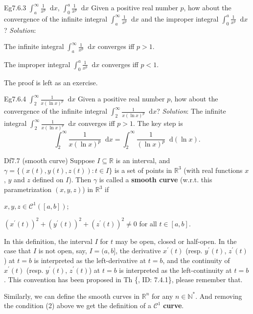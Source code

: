 \documentclass{article}
\newcommand{\dif}{\mathop{}\!\mathrm{d}}
\begin{document}
\begin{Th}{Eg7.6.3 $\int_a^\infty \frac{1}{x^p}\dif x$, $\int_0^a \frac{1}{x^p}\dif x$}
    Given a positive real number $p$, how about the convergence of the infinite integral $\int_a^\infty \frac{1}{x^p}\dif x$ and the improper integral $\int_0^a \frac{1}{x^p}\dif x$?
    \tcblower
    \textit{Solution}:
    \begin{compactenum}
        \item The infinite integral $\int_a^\infty \frac{1}{x^p}\dif x$ converges iff $p>1$.
        \item The improper integral $\int_0^a \frac{1}{x^p}\dif x$ converges iff $p<1$.
    \end{compactenum}
    The proof is left as an exercise.
\end{Th}

\begin{Th}{Eg7.6.4 $\int_2^\infty \frac{1}{x(\ln x)^p}\dif x$}
    Given a positive real number $p$, how about the convergence of the infinite integral $\int_2^\infty \frac{1}{x(\ln x)^p}\dif x$?
    \tcblower
    \textit{Solution}: The infinite integral $\int_2^\infty \frac{1}{x(\ln x)^p}\dif x$ converges iff $p>1$. The key step is
    $$\int_2^\infty \frac{1}{x(\ln x)^p}\dif x = \int_2^\infty \frac{1}{(\ln x)^p}\dif (\ln x).$$    
\end{Th}

\begin{Df}{Df7.7 (smooth curve)}
    Suppose $I\subseteq\mathbb{R}$ is an interval, and $\gamma = \{(x(t), y(t), z(t)): t\in I\}$ is a set of points in $\mathbb{R}^3$ (with real functions $x$, $y$ and $z$ defined on $I$). Then $\gamma$ is called a \textbf{smooth curve} (w.r.t. this parametrization $(x,y,z)$) in $\mathbb{R}^3$ if
    \begin{compactenum}
        \item $x, y, z\in \mathcal{C}^1([a, b])$;
        \item $(x^\prime(t))^2 + (y^\prime(t))^2 + (z^\prime(t))^2 \neq 0$ for all $t\in [a, b]$.
    \end{compactenum}
\end{Df}

\begin{Rmk}{}
    \begin{compactenum}
        \item In this definition, the interval $I$ for $t$ may be open, closed or half-open. In the case that $I$ is not open, say, $I = (a, b]$, the derivative $x^\prime(t)$ (resp. $y^\prime(t)$, $z^\prime(t)$) at $t = b$ is interpreted as the left-derivative at $t=b$, and the continuity of $x^\prime(t)$ (resp. $y^\prime(t)$, $z^\prime(t)$) at $t = b$ is interpreted as the left-continuity at $t=b$. This convention has been proposed in Th \{, ID: 7.4.1\}, please remember that.
        \item Similarly, we can define the smooth curves in $\mathbb{R}^n$ for any $n\in\mathbb{N}^\ast$. And removing the condition (2) above we get the definition of a $\mathcal{C}^1$ \textbf{curve}.
    \end{compactenum}
\end{Rmk}
\end{document}
